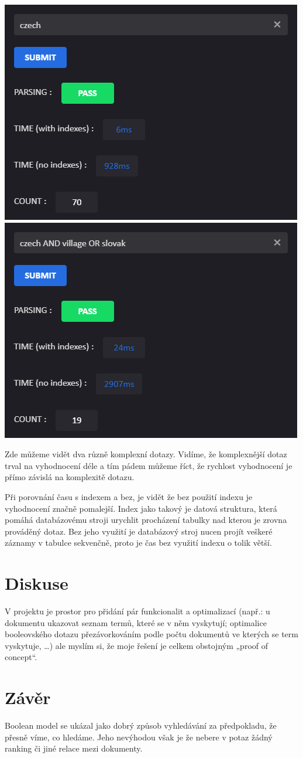 \documentclass[12pt,a4paper]{article}
\begin{document}
\begin{center}
  \includegraphics[width=.45\textwidth]{./images/short.png}
  \includegraphics[width=.45\textwidth]{./images/long.png}
\end{center}

Zde můžeme vidět dva různě komplexní dotazy. Vidíme, že komplexnější dotaz trval
na vyhodnocení déle a tím pádem můžeme říct, že rychlost vyhodnocení je přímo
závislá na komplexitě dotazu.

\begin{flushleft}
Při porovnání času s indexem a bez, je vidět že bez použití indexu je
vyhodnocení značně pomalejší. Index jako takový je datová struktura, která
pomáhá databázovému stroji urychlit procházení tabulky nad kterou je zrovna
prováděný dotaz. Bez jeho využití je databázový stroj nucen projít veškeré
záznamy v tabulce sekvenčně, proto je čas bez využití indexu o tolik větší.
\end{flushleft}

\section*{Diskuse}
V projektu je prostor pro přidání pár funkcionalit a optimalizací (např.: u
dokumentu ukazovat seznam termů, které se v něm vyskytují; optimalice
booleovského dotazu přezávorkováním podle počtu dokumentů ve kterých se term
vyskytuje, …) ale myslím si, že moje řešení je celkem obstojným „proof of
concept“.

\section*{Závěr}
Boolean model se ukázal jako dobrý způsob vyhledávání za předpokladu, že přesně
víme, co hledáme. Jeho nevýhodou však je že nebere v potaz žádný ranking či jiné
relace mezi dokumenty.
\end{document}

